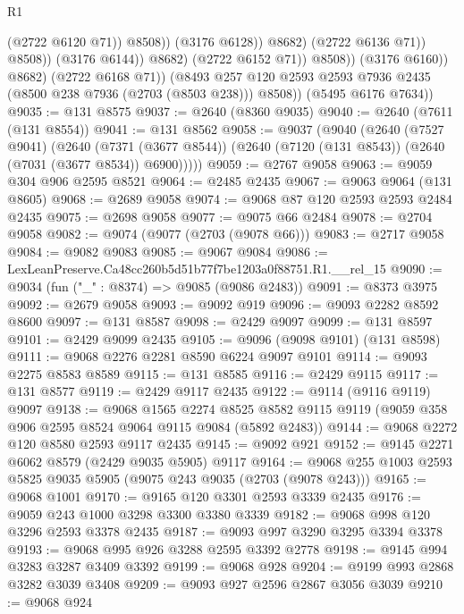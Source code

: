 \begin{lexlean}{R1}
\begin{coremodule}
                                        (@2722 @6120 @71))
                                      @8508))
                                  (@3176 @6128))
                                @8682)
                              (@2722 @6136 @71))
                            @8508))
                        (@3176 @6144))
                      @8682)
                    (@2722 @6152 @71))
                  @8508))
              (@3176 @6160))
            @8682)
          (@2722 @6168 @71))
        (@8493 @257 @120 @2593 @2593 @7936 @2435 (@8500 @238 @7936 (@2703 (@8503 @238))) @8508))
      (@5495 @6176 @7634))
@9035 := @131 @8575
@9037 := @2640 (@8360 @9035)
@9040 := @2640 (@7611 (@131 @8554))
@9041 := @131 @8562
@9058 := @9037
    (@9040
      (@2640
        (@7527 @9041)
        (@2640
          (@7371 (@3677 @8544))
          (@2640 (@7120 (@131 @8543)) (@2640 (@7031 (@3677 @8534)) @6900)))))
@9059 := @2767 @9058
@9063 := @9059 @304 @906 @2595 @8521
@9064 := @2485 @2435
@9067 := @9063 @9064 (@131 @8605)
@9068 := @2689 @9058
@9074 := @9068 @87 @120 @2593 @2593 @2484 @2435
@9075 := @2698 @9058
@9077 := @9075 @66 @2484
@9078 := @2704 @9058
@9082 := @9074 (@9077 (@2703 (@9078 @66)))
@9083 := @2717 @9058
@9084 := @9082 @9083
@9085 := @9067 @9084
@9086 := LexLeanPreserve.Ca48cc260b5d51b77f7be1203a0f88751.R1.__rel_15
@9090 := @9034 (fun ("_" : @8374) => @9085 (@9086 @2483))
@9091 := @8373 @3975
@9092 := @2679 @9058
@9093 := @9092 @919
@9096 := @9093 @2282 @8592 @8600
@9097 := @131 @8587
@9098 := @2429 @9097
@9099 := @131 @8597
@9101 := @2429 @9099 @2435
@9105 := @9096 (@9098 @9101) (@131 @8598)
@9111 := @9068 @2276 @2281 @8590 @6224 @9097 @9101
@9114 := @9093 @2275 @8583 @8589
@9115 := @131 @8585
@9116 := @2429 @9115
@9117 := @131 @8577
@9119 := @2429 @9117 @2435
@9122 := @9114 (@9116 @9119) @9097
@9138 := @9068
    @1565
    @2274
    @8525
    @8582
    @9115
    @9119
    (@9059 @358 @906 @2595 @8524 @9064 @9115 @9084 (@5892 @2483))
@9144 := @9068 @2272 @120 @8580 @2593 @9117 @2435
@9145 := @9092 @921
@9152 := @9145 @2271 @6062 @8579 (@2429 @9035 @5905) @9117
@9164 := @9068 @255 @1003 @2593 @5825 @9035 @5905 (@9075 @243 @9035 (@2703 (@9078 @243)))
@9165 := @9068 @1001
@9170 := @9165 @120 @3301 @2593 @3339 @2435
@9176 := @9059 @243 @1000 @3298 @3300 @3380 @3339
@9182 := @9068 @998 @120 @3296 @2593 @3378 @2435
@9187 := @9093 @997 @3290 @3295 @3394 @3378
@9193 := @9068 @995 @926 @3288 @2595 @3392 @2778
@9198 := @9145 @994 @3283 @3287 @3409 @3392
@9199 := @9068 @928
@9204 := @9199 @993 @2868 @3282 @3039 @3408
@9209 := @9093 @927 @2596 @2867 @3056 @3039
@9210 := @9068 @924

\end{coremodule}
\end{lexlean}
